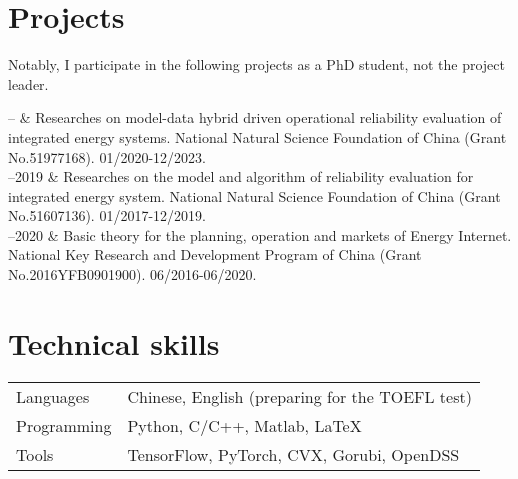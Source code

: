 \documentclass[11pt, a4paper]{article}
\newcommand{\TablePad}{\vspace{-0.4cm}}
\newcommand{\Duration}[2]{\fontsize{10pt}{0}\selectfont #1--#2}
\begin{document}
\section{Projects} 
Notably, I participate in the following projects as a PhD student, not the project leader.
\begin{EntriesTable}
	\Duration{2020}{}  &
	Researches on model-data hybrid driven operational reliability
	evaluation of integrated energy systems. National Natural Science Foundation of China (Grant No.51977168). 01/2020-12/2023.
	\\
	\Duration{2017}{2019}  &
	Researches on the model and algorithm of reliability evaluation for integrated energy system. National Natural Science Foundation of China (Grant No.51607136). 01/2017-12/2019.
	\\
	\Duration{2016}{2020}  &
	Basic theory for the planning, operation and markets of Energy Internet. National Key Research and Development Program of China (Grant No.2016YFB0901900). 06/2016-06/2020.
\end{EntriesTable}


\section{Technical skills}

\TablePad
\begin{tabularx}{\textwidth}{@{}p{} p{}@{}}
  Languages & Chinese, English (preparing for the TOEFL test)
  \\
  Programming & Python, C/C++, Matlab, LaTeX
  \\
  Tools & TensorFlow, PyTorch, CVX, Gorubi, OpenDSS
\end{tabularx}
\end{document}
